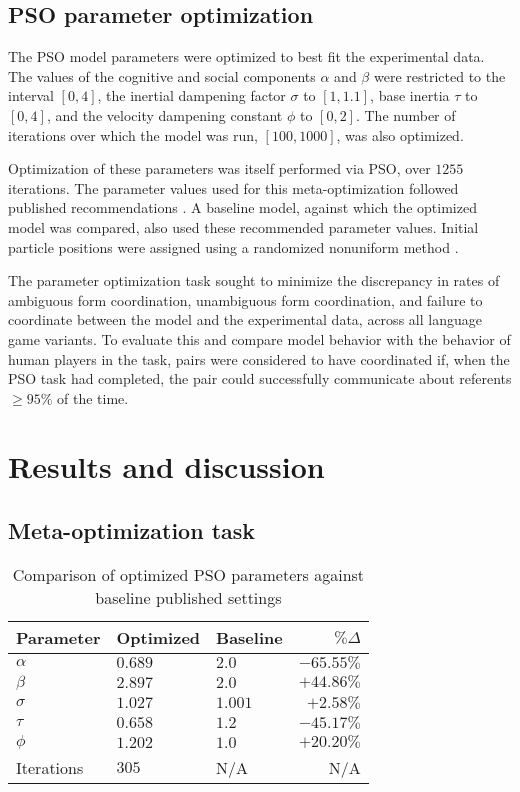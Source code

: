 \documentclass[a4paper,11pt]{article}
\begin{document}
\subsection{PSO parameter optimization}
\label{sec:param_opt}
The PSO model parameters were optimized to best fit the experimental data. The values of the cognitive and social components $\alpha$ and $\beta$ were restricted to the interval $[0,4]$, the inertial dampening factor $\sigma$ to $[1,1.1]$, base inertia $\tau$ to $[0,4]$, and the velocity dampening constant $\phi$ to $[0,2]$. The number of iterations over which the model was run, $[100,1000]$, was also optimized.

Optimization of these parameters was itself performed via PSO, over $1255$ iterations. The parameter values used for this meta-optimization followed published recommendations \cite{shi1998,solnon2010}. A baseline model, against which the optimized model was compared, also used these recommended parameter values. Initial particle positions were assigned using a randomized nonuniform method \cite{mitchell1991}. 

The parameter optimization task sought to minimize the discrepancy in rates of ambiguous form coordination, unambiguous form coordination, and failure to coordinate between the model and the experimental data, across all language game variants. To evaluate this and compare model behavior with the behavior of human players in the task, pairs were considered to have coordinated if, when the PSO task had completed, the pair could successfully communicate about referents $\geq 95\%$ of the time.


\section{Results and discussion}
\subsection{Meta-optimization task}
\label{sec:parameter_optimization}

\begin{table}[]
\begin{center}
    \begin{tabular}{ l l l r }
    Parameter  & Optimized & Baseline & $\% \Delta$ \\ \hline
    $\alpha$   & $0.689$   & $2.0$    & $-65.55\%$ \\ \hline
    $\beta$    & $2.897$   & $2.0$    & $+44.86\%$ \\ \hline
    $\sigma$   & $1.027$   & $1.001$  & $+2.58\%$\\ \hline
    $\tau$     & $0.658$   & $1.2$    & $-45.17\%$ \\ \hline
    $\phi$     & $1.202$   & $1.0$    & $+20.20\%$\\ \hline
    Iterations & $305$     & N/A      & N/A\\ 
    \end{tabular}
   	\caption{Comparison of optimized PSO parameters against baseline published settings}
	\label{table:1}
\end{center}
\end{table}
\end{document}
